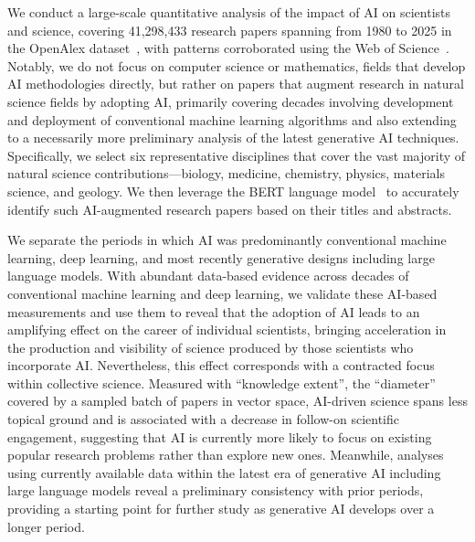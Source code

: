 We conduct a large-scale quantitative analysis of the impact of AI on scientists and science, covering 41,298,433 research papers spanning from 1980 to 2025 in the OpenAlex dataset~\supercite{openalex}, with patterns corroborated using the Web of Science~\supercite{WoS,mongeon2016journal}.
Notably, we do not focus on computer science or mathematics, fields that develop AI methodologies directly, but rather on papers that augment research in natural science fields by adopting AI, primarily covering decades involving development and deployment of conventional machine learning algorithms and also extending to a necessarily more preliminary analysis of the latest generative AI techniques.
Specifically, we select six representative disciplines that cover the vast majority of natural science contributions—biology, medicine, chemistry, physics, materials science, and geology.
We then leverage the BERT language model~\supercite{DBLP:conf/naacl/DevlinCLT19,wolf-etal-2020-transformers} to accurately identify such AI-augmented research papers based on their titles and abstracts.

We separate the periods in which AI was predominantly conventional machine learning, deep learning, and most recently generative designs including large language models. With abundant data-based evidence across decades of conventional machine learning and deep learning, we validate these AI-based measurements and use them to reveal that the adoption of AI leads to an amplifying effect on the career of individual scientists, bringing acceleration in the production and visibility of science produced by those scientists who incorporate AI.
Nevertheless, this effect corresponds with a contracted focus within collective science.
Measured with “knowledge extent”, the “diameter” covered by a sampled batch of papers in vector space, AI-driven science spans less topical ground and is associated with a decrease in follow-on scientific engagement, suggesting that AI is currently more likely to focus on existing popular research problems rather than explore new ones.
Meanwhile, analyses using currently available data within the latest era of generative AI including large language models reveal a preliminary consistency with prior periods, providing a starting point for further study as generative AI develops over a longer period.